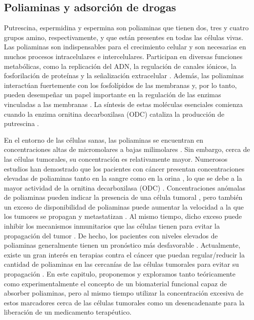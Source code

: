 
\subsection{Poliaminas y adsorci\'on de drogas}

Putrescina, espermidina y espermina son poliaminas que tienen dos, tres y cuatro grupos amino, respectivamente, y que est\'an presentes en todas las c\'elulas vivas.
Las poliaminas son indispensables para el crecimiento celular y son necesarias en muchos procesos intracelulares e intercelulares.
Participan en diversas funciones metab\'olicas, como la replicaci\'on del ADN, la regulaci\'on de canales i\'onicos, la fosforilaci\'on de prote\'inas y la se\~nalizaci\'on extracelular .
Adem\'as, las poliaminas interact\'uan fuertemente con los fosfol\'ipidos de las membranas y, por lo tanto, pueden desempe\~nar un papel importante en la regulaci\'on de las enzimas vinculadas a las membranas \addcite[Moinard2005].
La s\'intesis de estas mol\'eculas esenciales comienza cuando la enzima ornitina decarboxilasa (ODC) cataliza la producción de putrescina .

En el entorno de las c\'elulas sanas, las poliaminas se encuentran en concentraciones altas de micromolares a bajas milimolares .
Sin embargo, cerca de las c\'elulas tumorales, su concentraci\'on es relativamente mayor.
Numerosos estudios han demostrado que los pacientes con c\'ancer presentan concentraciones elevadas de poliaminas tanto en la sangre como en la orina \addcite[Russell1971], lo que se debe a la mayor actividad de la ornitina decarboxilasa (ODC) .
Concentraciones an\'omalas de poliaminas pueden indicar la presencia de una c\'elula tumoral , pero tambi\'en un exceso de disponibilidad de poliaminas puede aumentar la velocidad a la que los tumores se propagan y metastatizan \addcite[Soda2011].
Al mismo tiempo, dicho exceso puede inhibir los mecanismos inmunitarios que las c\'elulas tienen para evitar la propagaci\'on del tumor .
De hecho, los pacientes con niveles elevados de poliaminas generalmente tienen un pron\'ostico m\'as desfavorable .
Actualmente, existe un gran inter\'es en terapias contra el c\'ancer que puedan regular/reducir la cantidad de poliaminas en las cercan\'ias de las c\'elulas tumorales para evitar su propagaci\'on .
En este capitulo, proponemos y exploramos tanto te\'oricamente como experimentalmente el concepto de un biomaterial funcional capaz de absorber poliaminas, pero al mismo tiempo utilizar la concentraci\'on excesiva de estos marcadores cerca de las c\'elulas tumorales como un desencadenante para la liberaci\'on de un medicamento terap\'eutico.

